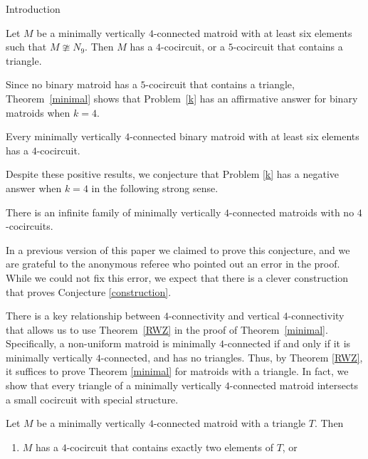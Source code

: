 \documentclass[12pt]{amsart}
\begin{document}
\begin{section}{Introduction}
\begin{theorem} \label{minimal}
Let $M$ be a minimally vertically $4$-connected matroid with at least six elements such that $M \ncong N_9$.
Then $M$ has a $4$-cocircuit, or a $5$-cocircuit that contains a triangle.
\end{theorem}


Since no binary matroid has a $5$-cocircuit that contains a triangle, Theorem~\ref{minimal} shows that Problem~\ref{k} has an affirmative answer for binary matroids when $k = 4$.


\begin{theorem} \label{binary}
Every minimally vertically $4$-connected binary matroid with at least six elements has a $4$-cocircuit.
\end{theorem}


Despite these positive results, we conjecture that Problem \ref{k} has a negative answer when $k  = 4$ in the following strong sense.

\begin{conjecture} \label{construction}
There is an infinite family of minimally vertically $4$-connected matroids with no $4$-cocircuits.
\end{conjecture}


In a previous version of this paper we claimed to prove this conjecture, and we are grateful to the anonymous referee who pointed out an error in the proof.
While we could not fix this error, we expect that there is a clever construction that proves Conjecture \ref{construction}.



There is a key relationship between $4$-connectivity and vertical $4$-connectivity that allows us to use Theorem~\ref{RWZ} in the proof of Theorem~\ref{minimal}.
Specifically, a non-uniform matroid is minimally $4$-connected if and only if it is minimally vertically $4$-connected, and has no triangles.
Thus, by Theorem \ref{RWZ}, it suffices to prove Theorem \ref{minimal} for matroids with a triangle.
In fact, we show that every triangle of a minimally vertically $4$-connected matroid intersects a small cocircuit with special structure.

\begin{theorem} \label{minimal triangle}
Let $M$ be a minimally vertically $4$-connected matroid with a triangle $T$. Then
\begin{enumerate}[$(1)$]
\item $M$ has a $4$-cocircuit that contains exactly two elements of $T$, or


\end{enumerate}
\end{theorem}
\end{section}
\end{document}
